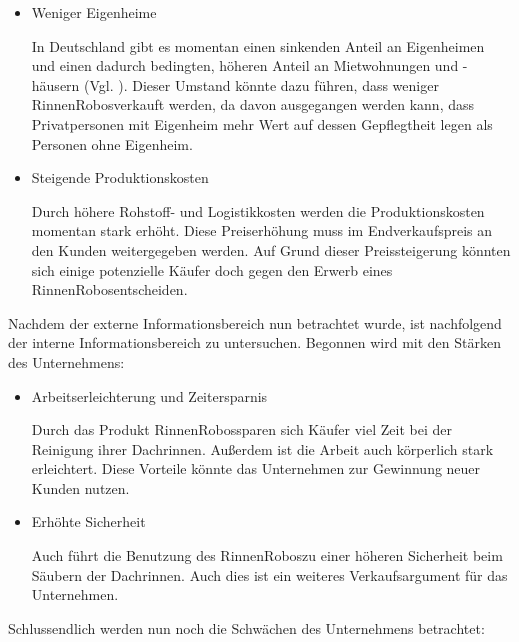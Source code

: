     \begin{itemize}
        \item Weniger Eigenheime

            In Deutschland gibt es momentan einen sinkenden Anteil an Eigenheimen und einen dadurch bedingten, höheren
            Anteil an Mietwohnungen und -häusern (Vgl. \cite{Mueller2021}). Dieser Umstand könnte dazu führen, dass
            weniger \as RinnenRobos\adl verkauft werden, da davon ausgegangen werden kann, dass Privatpersonen mit 
            Eigenheim mehr Wert auf dessen Gepflegtheit legen als Personen ohne Eigenheim.

        \item Steigende Produktionskosten
        
            Durch höhere Rohstoff- und Logistikkosten werden die Produktionskosten momentan stark erhöht. Diese
            Preiserhöhung muss im Endverkaufspreis an den Kunden weitergegeben werden. Auf Grund dieser Preissteigerung
            könnten sich einige potenzielle Käufer doch gegen den Erwerb eines \as RinnenRobos\adl entscheiden.
    \end{itemize}

\noindent Nachdem der externe Informationsbereich nun betrachtet wurde, ist nachfolgend der interne Informationsbereich
zu untersuchen. Begonnen wird mit den Stärken des Unternehmens:

    \begin{itemize}
        \item Arbeitserleichterung und Zeitersparnis
        
            Durch das Produkt \as RinnenRobos\adl sparen sich Käufer viel Zeit bei der Reinigung ihrer Dachrinnen.
            Außerdem ist die Arbeit auch körperlich stark erleichtert. Diese Vorteile könnte das Unternehmen zur
            Gewinnung neuer Kunden nutzen.

        \item Erhöhte Sicherheit
        
            Auch führt die Benutzung des \as RinnenRobos\adl zu einer höheren Sicherheit beim Säubern der Dachrinnen.
            Auch dies ist ein weiteres Verkaufsargument für das Unternehmen.
    \end{itemize}

\noindent Schlussendlich werden nun noch die Schwächen des Unternehmens betrachtet:


